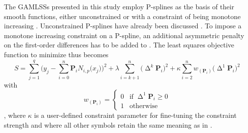 The GAMLSSs presented in this study employ P-splines as the basis of their smooth functions, either unconstrained \parencite{Eilers1996} or with a constraint of being monotone increasing \parencite{Bollaerts2006}.  Unconstrained P-splines have already been discussed .  To impose a monotone increasing constraint on a P-spline, an additional asymmetric penalty on the first-order differences has to be added to .  The least squares objective function to minimize thus becomes
\begin{equation}
  \label{eq:PSplineOLSMonotoneIncreasingConstraint}
  S =
  \sum_{j = 1}^q 
  \Biggl(
  y_j - \sum_{i = 0}^n \symbf{P}_i N_{i, p}\bigl(x_j\bigr)
  \Biggr)^2
  + \lambda \sum_{i = k + 1}^n \bigl(\upDelta^k \symbf{P}_i\bigr)^2
  + \kappa \sum_{i = 2}^n w_{(\symbf{P}_i)}\bigl(\upDelta^1 \symbf{P}_i\bigr)^2
\end{equation}
with
\begin{equation}
  \label{eq:PSlineOLSMonotoneIncreasingConstraintWFunction}
  w_{(\symbf{P}_i)} =
  \begin{cases}
    0 &\text{if } \upDelta^1 \symbf{P}_i \geq 0 \\
    1 &\text{otherwise}
  \end{cases}
\end{equation}
\parencite{Bollaerts2006}, where \(\kappa\) is a user-defined constraint parameter for fine-tuning the constraint strength and where all other symbols retain the same meaning as in .

